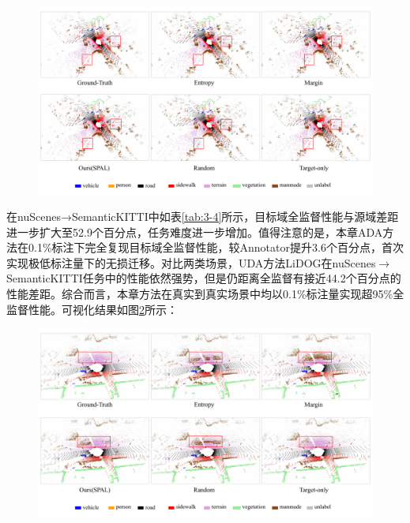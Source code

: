 \vspace{-0.1cm}
\begin{figure}[h]
    \centering
    \includegraphics[width = \textwidth]{ljx/figure/3_vision_k2n.pdf}
    \label{fig:3-v-3}
\end{figure}
\vspace{-0.35cm}
在nuScenes→SemanticKITTI中如表\ref{tab:3-4}所示，目标域全监督性能与源域差距进一步扩大至52.9个百分点，任务难度进一步增加。值得注意的是，本章ADA方法在0.1\%标注下完全复现目标域全监督性能，较Annotator提升3.6个百分点，首次实现极低标注量下的无损迁移。对比两类场景，UDA方法LiDOG在nuScenes\(\to\)SemanticKITTI任务中的性能依然强势，但是仍距离全监督有接近44.2个百分点的性能差距。综合而言，本章方法在真实到真实场景中均以0.1\%标注量实现超95\%全监督性能。可视化结果如图\ref{fig:3-v-4}所示：
\vspace{0.1cm}


\vspace{-0.1cm}
\begin{figure}[H]
    \centering
    \includegraphics[width = \textwidth]{ljx/figure/3_vision_n2k.pdf}
    \label{fig:3-v-4}
\end{figure}
\vspace{-0.35cm}

